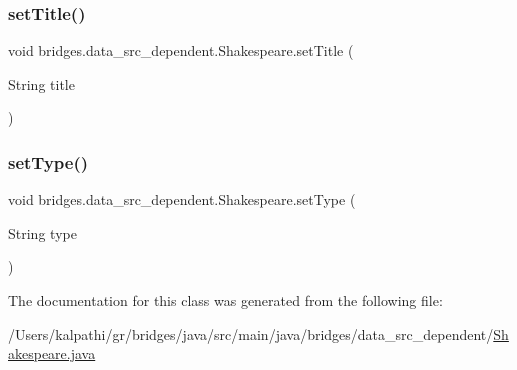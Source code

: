 \mbox{\label{classbridges_1_1data__src__dependent_1_1_shakespeare_a2687017aca35bb26b148f784a0bff732}} 
\subsubsection{\texorpdfstring{setTitle()}{setTitle()}}
{\footnotesize\ttfamily void bridges.\+data\+\_\+src\+\_\+dependent.\+Shakespeare.\+set\+Title (\begin{DoxyParamCaption}\item[{String}]{title }\end{DoxyParamCaption})}

\mbox{\label{classbridges_1_1data__src__dependent_1_1_shakespeare_afcee18014d5630a0a15701635005bea2}} 
\subsubsection{\texorpdfstring{setType()}{setType()}}
{\footnotesize\ttfamily void bridges.\+data\+\_\+src\+\_\+dependent.\+Shakespeare.\+set\+Type (\begin{DoxyParamCaption}\item[{String}]{type }\end{DoxyParamCaption})}



The documentation for this class was generated from the following file\+:\begin{DoxyCompactItemize}
\item 
/\+Users/kalpathi/gr/bridges/java/src/main/java/bridges/data\+\_\+src\+\_\+dependent/\mbox{\hyperlink{_shakespeare_8java}{Shakespeare.\+java}}\end{DoxyCompactItemize}
